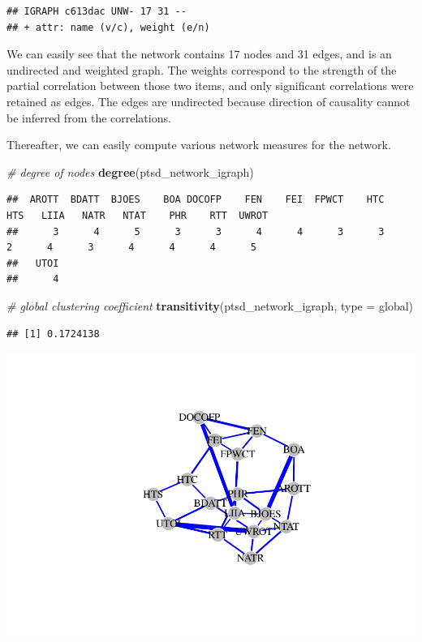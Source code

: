 \documentclass[
]{book}
\newenvironment{Shaded}{\begin{snugshade}}{\end{snugshade}}
\newcommand{\AttributeTok}[1]{\textcolor[rgb]{0.13,0.29,0.53}{#1}}
\newcommand{\CommentTok}[1]{\textcolor[rgb]{0.56,0.35,0.01}{\textit{#1}}}
\newcommand{\FunctionTok}[1]{\textcolor[rgb]{0.13,0.29,0.53}{\textbf{#1}}}
\newcommand{\NormalTok}[1]{#1}
\newcommand{\StringTok}[1]{\textcolor[rgb]{0.31,0.60,0.02}{#1}}
\begin{document}
\begin{verbatim}
## IGRAPH c613dac UNW- 17 31 -- 
## + attr: name (v/c), weight (e/n)
\end{verbatim}

We can easily see that the network contains 17 nodes and 31 edges, and is an undirected and weighted graph. The weights correspond to the strength of the partial correlation between those two items, and only significant correlations were retained as edges. The edges are undirected because direction of causality cannot be inferred from the correlations.

Thereafter, we can easily compute various network measures for the network.

\begin{Shaded}
\begin{Highlighting}[]
\CommentTok{\# degree of nodes}
\FunctionTok{degree}\NormalTok{(ptsd\_network\_igraph)}
\end{Highlighting}
\end{Shaded}

\begin{verbatim}
##  AROTT  BDATT  BJOES    BOA DOCOFP    FEN    FEI  FPWCT    HTC    HTS   LIIA   NATR   NTAT    PHR    RTT  UWROT 
##      3      4      5      3      3      4      4      3      3      2      4      3      4      4      4      5 
##   UTOI 
##      4
\end{verbatim}

\begin{Shaded}
\begin{Highlighting}[]
\CommentTok{\# global clustering coefficient }
\FunctionTok{transitivity}\NormalTok{(ptsd\_network\_igraph, }\AttributeTok{type =} \StringTok{\textquotesingle{}global\textquotesingle{}}\NormalTok{)}
\end{Highlighting}
\end{Shaded}

\begin{verbatim}
## [1] 0.1724138
\end{verbatim}

\includegraphics{bookdown-demo_files/figure-latex/test-1.pdf}
\end{document}
